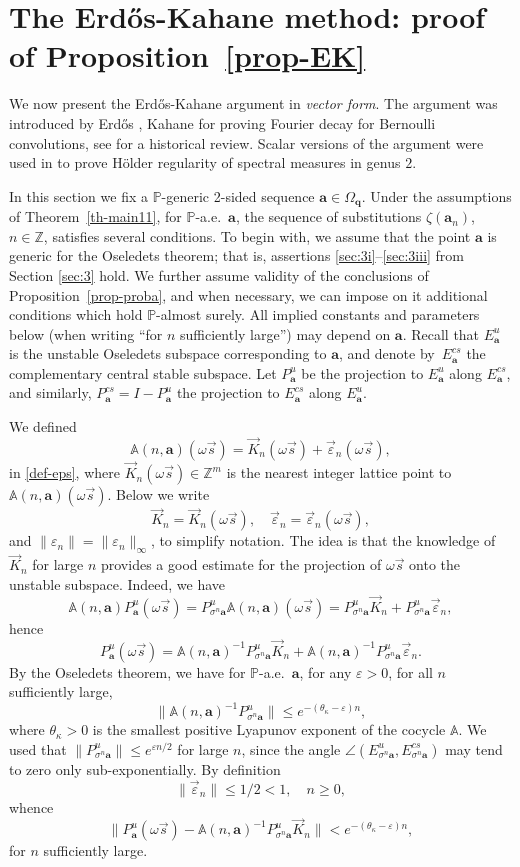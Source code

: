 \documentclass[JEP,XML,SOM,Unicode]{cedram}
\let\epsilon\varepsilon
\theoremstyle{plain}
\theoremstyle{definition}
\newcommand\bom{{\boldsymbol a}}\let\ba\bom
\newcommand\bq{{\boldsymbol q}}
\let\eps\varepsilon
\let\om\omega
\let\Om\Omega
\let\sig\sigma
\newcommand\Aa{\mathbb{A}}
\newcommand{\Z}{\mathbb{Z}}
\renewcommand{\P}{\mathbb{P}}
\newcommand\be{\begin{equation}}
\newcommand\ee{\end{equation}}
\begin{document}
\section{The Erd\H{o}s-Kahane method: proof of Proposition~\ref{prop-EK} }

We now present the Erd\H{o}s-Kahane argument in {\it vector form}. The argument was introduced by Erd\H{o}s \cite{Erd} , Kahane \cite{Kahane} for proving Fourier decay for Bernoulli convolutions, see \cite{sixty} for a historical review. Scalar versions of the argument were used in \cite{BuSol2,BuSo18a} to prove Hölder regularity of spectral measures in genus $2$.

In this section we fix a $\P$-generic 2-sided sequence $\bom\in \Om_\bq$.
Under the assumptions of Theorem~\ref{th-main11}, for $\P$-a.e.\ $\bom$, the sequence of substitutions $\zeta(\bom_n)$,
$n\in \Z$, satisfies several conditions.
To begin with, we assume that the point $\bom$ is generic for the Oseledets theorem; that is, assertions \eqref{sec:3i}--\eqref{sec:3iii} from Section \ref{sec:3} hold. We further assume validity of the conclusions
of Proposition~\ref{prop-proba}, and when necessary, we can impose on it additional conditions which hold $\P$-almost surely.
All implied constants and parameters below (\eg when writing ``for $n$ sufficiently large'') may depend on $\bom$.
Recall that $E^u_\bom$ is the unstable Oseledets subspace corresponding to $\bom$, and denote by~$E^{cs}_\bom$ the complementary central stable subspace. Let $P^u_\bom$ be the
projection to $E^u_\bom$ along $E^{cs}_\bom$, and similarly, $P^{cs}_\bom = I - P^u_\bom$ the projection to $E^{cs}_\bom$ along $E^u_\bom$.

We defined
\[
\Aa(n,\bom) (\om\vec s) = \vec{K}_n(\om\vec s) + \vec{\eps}_n(\om\vec s),
\]
in \eqref{def-eps}, where $\vec K_n(\om\vec s)\in \Z^m$ is the nearest integer lattice point to $\Aa(n,\bom) (\om\vec s)$. Below we write
\[
\vec K_n = \vec{K}_n(\om\vec s),\quad \vec\eps_n = \vec{\eps}_n(\om\vec s),
\]
and $\|\eps_n\| = \|\eps_n\|_\infty$,
to simplify notation.
The idea is that the knowledge of $\vec K_n$ for large $n$ provides a good estimate for the projection of $\om\vec s$ onto the unstable subspace. Indeed, we have
\[
\Aa(n,\bom) P_\bom^u(\om\vec s)=P_{\sig^n\bom}^u \Aa(n,\bom) (\om\vec s)= P_{\sig^n\bom}^u \vec{K}_n + P_{\sig^n\bom}^u \vec{\eps}_n,
\]
hence
\[
P^u_\bom(\om\vec s) = \Aa(n,\bom)^{-1} P_{\sig^n\bom}^u \vec{K}_n + \Aa(n,\bom)^{-1} P_{\sig^n\bom}^u \vec{\eps}_n.
\]
By the Oseledets theorem, we have for $\P$-a.e.\ $\bom$, for any $\epsilon>0$, for all $n$ sufficiently large,
\[
\|\Aa(n,\bom)^{-1}P^u_{\sig^n\bom}\|\le e^{-(\theta_\kappa-\epsilon)n},
\]
where $\theta_\kappa>0$ is the smallest positive Lyapunov exponent of the cocycle $\Aa$.
We used that $\|P^u_{\sig^n\bom}\|\le e^{\eps n/2}$ for large $n$, since the angle $\angle(E^u_{\sig^n\bom}, E^{cs}_{\sig^n\bom})$ may tend to zero only sub-exponentially.
By definition
\be \label{up1}
\|\vec{\eps}_n\|\le 1/2<1,\quad n\ge 0,
\ee
whence
\be \label{good-est}
\|P^u_\bom(\om\vec s) -\Aa(n,\bom)^{-1} P_{\sig^n\bom}^u \vec{K}_n\| < e^{-(\theta_\kappa-\epsilon)n},
\ee
for $n$ sufficiently large.
\end{document}
